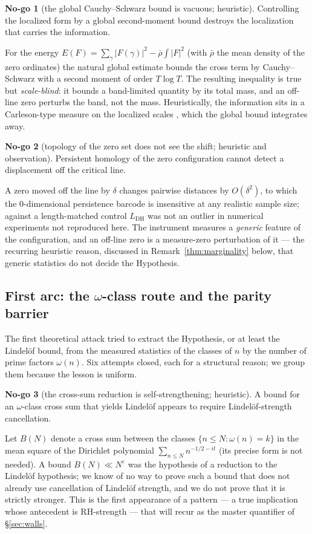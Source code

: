 \documentclass[11pt]{amsart}
\theoremstyle{definition}
\theoremstyle{remark}
\theoremstyle{definition}
\newtheorem{nogo}{No-go}[section]
\begin{document}
\begin{nogo}[the global Cauchy--Schwarz bound is vacuous; heuristic]\label{ng:cs}
Controlling the localized form by a global second-moment bound destroys the localization that carries the
information.
\end{nogo}
\noindent For the energy $E(F)=\sum_\gamma|F(\gamma)|^2-\bar\rho\!\int|F|^2$ (with $\bar\rho$ the mean
density of the zero ordinates) the natural global estimate bounds the cross term by Cauchy--Schwarz with a second moment of order $T\log T$. The resulting inequality
is true but \emph{scale-blind}: it bounds a band-limited quantity by its total mass, and an off-line zero
perturbs the band, not the mass. Heuristically, the information sits in a Carleson-type measure
on the localized scales \cite{Carleson}, which the global bound integrates away.

\begin{nogo}[topology of the zero set does not see the shift; heuristic and observation]\label{ng:tda}
Persistent homology of the zero configuration cannot detect a displacement off the critical line.
\end{nogo}
\noindent A zero moved off the line by $\delta$ changes pairwise distances by $O(\delta^2)$, to which the
$0$-dimensional persistence barcode is insensitive at any realistic sample size; against a length-matched
control $L_{\mathrm{DH}}$ was not an outlier in numerical experiments not reproduced here. The instrument
measures a \emph{generic} feature of the configuration, and an off-line zero is a measure-zero
perturbation of it --- the recurring heuristic reason, discussed in Remark~\ref{thm:marginality} below,
that generic statistics do not decide the Hypothesis.

\subsection{First arc: the $\omega$-class route and the parity barrier}\label{sec:arcA}

The first theoretical attack tried to extract the Hypothesis, or at least the Lindel\"of bound, from the
measured statistics of the classes of $n$ by the number of prime factors $\omega(n)$. Six attempts closed,
each for a structural reason; we group them because the lesson is uniform.

\begin{nogo}[the cross-sum reduction is self-strengthening; heuristic]\label{ng:circular}
A bound for an $\omega$-class cross sum that yields Lindel\"of appears to require Lindel\"of-strength cancellation.
\end{nogo}
\noindent Let $B(N)$ denote a cross sum between the classes $\{n\le N:\omega(n)=k\}$ in the mean square of the Dirichlet polynomial $\sum_{n\le N}n^{-1/2-it}$ (its precise form is not needed). A bound $B(N)\ll N^\varepsilon$ was the hypothesis of a reduction to the Lindel\"of hypothesis; we know of no way to prove such a bound that does not already use cancellation of Lindel\"of strength, and we do not prove that it is strictly stronger. This is the first appearance of a pattern --- a true
implication whose antecedent is RH-strength --- that will recur as the master quantifier of
\S\ref{sec:walls}.
\end{document}
